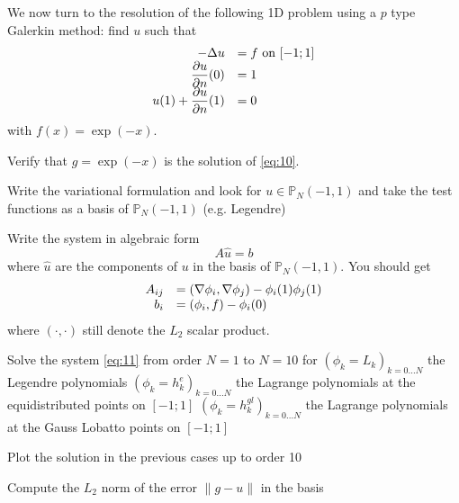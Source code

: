 \documentclass{article}
\begin{document}
\begin{Exercise}[title={p type Galerkin method in 1D}]
  \ExePart 
  We now turn to the resolution of the following 1D problem using a $p$ type Galerkin method: find $u$ such that
  \begin{equation}
    \label{eq:10}
    \begin{array}[c]{rl}
      -\Delta u &= f \text{ on } [-1;1]\\
      \displaystyle \frac{\partial u}{\partial n}(0) &= 1\\
      \displaystyle u(1) + \frac{\partial u}{\partial n}(1) &= 0\\
    \end{array}
  \end{equation}
  with $f(x)=\exp(-x)$.
  
  \Question Verify that $g=\exp(-x)$ is the solution  of \eqref{eq:10}.

  \Question Write the variational formulation and look for $u \in
  \mathbb{P}_N(-1,1)$ and take the test functions as a basis of
  $\mathbb{P}_N(-1,1)$ (e.g. Legendre)

  \Question Write the system in algebraic form
  \begin{equation}
    \label{eq:11}
    A \hat{u} = b
  \end{equation}
  where $\hat{u}$ are the components of $u$ in the basis of
  $\mathbb{P}_N(-1,1)$.
  You should get 
  \begin{equation}
    \label{eq:12}
    \begin{array}[c]{rl}
      A_{ij} &= (\nabla \phi_i, \nabla \phi_j) - \phi_i(1)\phi_j(1)\\
      b_i &= (\phi_i,f) - \phi_i(0)
    \end{array}
  \end{equation}
  where $(\cdot,\cdot)$ still denote the $L_2$ scalar product.

  \Question Solve the system \eqref{eq:11} from order $N=1$ to $N=10$ for
  \subQuestion $(\phi_k = L_k)_{k=0...N}$ the Legendre polynomials
  \subQuestion $(\phi_k = h^{e}_k)_{k=0...N}$ the Lagrange polynomials at the equidistributed points on $[-1;1]$
  \subQuestion $(\phi_k = h^{gl}_k)_{k=0...N}$ the Lagrange polynomials at the Gauss Lobatto points on $[-1;1]$

  \Question Plot the solution in the previous cases up to order 10
   
  \Question Compute the $L_2$ norm of the error $\|g-u\|$ in the basis
\end{Exercise}
\end{document}
